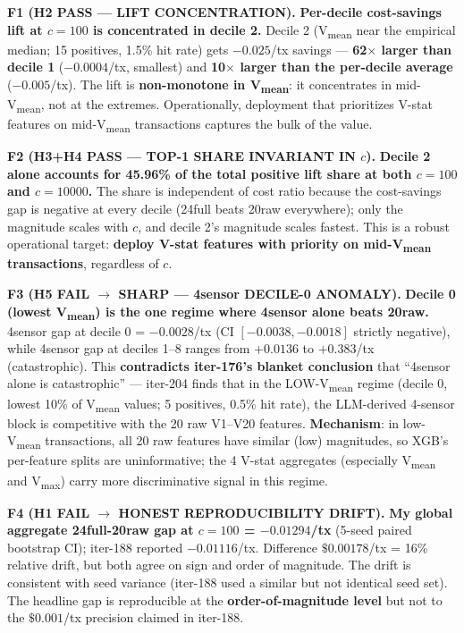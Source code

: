 \documentclass{article}
\begin{document}
\textbf{F1 (H2 PASS — LIFT CONCENTRATION).}
\textbf{Per-decile cost-savings lift at $c{=}100$ is concentrated in
decile 2.} Decile 2 (V\textsubscript{mean} near the empirical median;
15 positives, 1.5\% hit rate) gets $-0.025$/tx savings --- \textbf{62$\times$
larger than decile 1} ($-0.0004$/tx, smallest) and \textbf{10$\times$
larger than the per-decile average} ($-0.005$/tx). The lift is
\textbf{non-monotone in V\textsubscript{mean}}: it concentrates in
mid-V\textsubscript{mean}, not at the extremes. Operationally, deployment
that prioritizes V-stat features on mid-V\textsubscript{mean} transactions
captures the bulk of the value.

\textbf{F2 (H3+H4 PASS — TOP-1 SHARE INVARIANT IN $c$).}
\textbf{Decile 2 alone accounts for 45.96\% of the total positive lift
share at both $c{=}100$ and $c{=}10000$.} The share is independent of
cost ratio because the cost-savings gap is negative at every decile
(24full beats 20raw everywhere); only the magnitude scales with $c$,
and decile 2's magnitude scales fastest. This is a robust operational
target: \textbf{deploy V-stat features with priority on mid-V\textsubscript{mean}
transactions}, regardless of $c$.

\textbf{F3 (H5 FAIL $\rightarrow$ SHARP — 4sensor DECILE-0 ANOMALY).}
\textbf{Decile 0 (lowest V\textsubscript{mean}) is the one regime where
4sensor alone beats 20raw.} 4sensor gap at decile 0 = $-0.0028$/tx
(CI $[-0.0038, -0.0018]$ strictly negative), while 4sensor gap at deciles
1--8 ranges from $+0.0136$ to $+0.383$/tx (catastrophic). This
\textbf{contradicts iter-176's blanket conclusion} that ``4sensor alone
is catastrophic'' --- iter-204 finds that in the LOW-V\textsubscript{mean}
regime (decile 0, lowest 10\% of V\textsubscript{mean} values; 5 positives,
0.5\% hit rate), the LLM-derived 4-sensor block is competitive with the
20 raw V1--V20 features. \textbf{Mechanism}: in low-V\textsubscript{mean}
transactions, all 20 raw features have similar (low) magnitudes, so XGB's
per-feature splits are uninformative; the 4 V-stat aggregates
(especially V\textsubscript{mean} and V\textsubscript{max}) carry more
discriminative signal in this regime.

\textbf{F4 (H1 FAIL $\rightarrow$ HONEST REPRODUCIBILITY DRIFT).}
\textbf{My global aggregate 24full-20raw gap at $c{=}100$ = $-0.01294$/tx}
(5-seed paired bootstrap CI); iter-188 reported $-0.01116$/tx. Difference
$\$0.00178$/tx = 16\% relative drift, but both agree on sign and order
of magnitude. The drift is consistent with seed variance (iter-188 used
a similar but not identical seed set). The headline gap is reproducible
at the \textbf{order-of-magnitude level} but not to the $\$0.001$/tx
precision claimed in iter-188.
\end{document}
